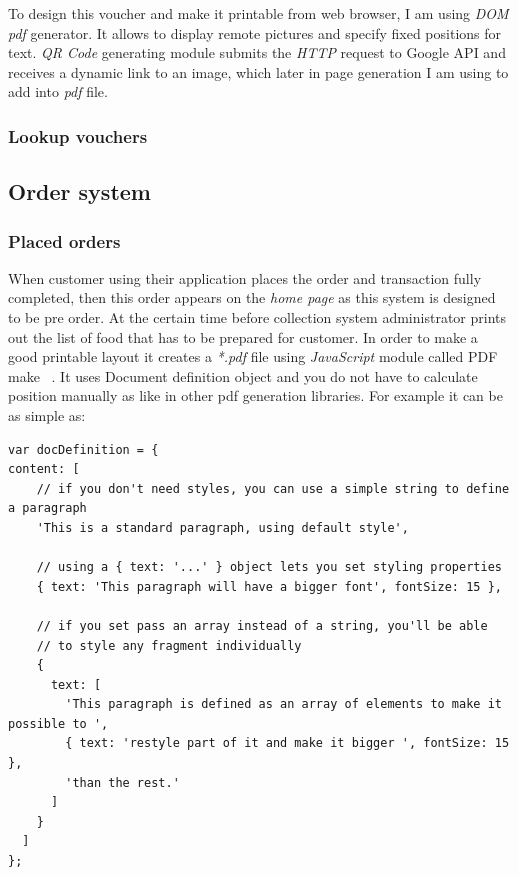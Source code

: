 To design this voucher and make it printable from web browser, I am using \textit{DOM pdf} generator. It allows to display remote pictures and specify fixed positions for text. \textit{QR Code} generating module submits the \textit{HTTP} request to Google API and receives a dynamic link to an image, which later in page generation I am using to add into \textit{pdf} file.


	\subsubsection{Lookup vouchers}
	

	\subsection{Order system}
		\subsubsection{Placed orders}
			When customer using their application places the order and transaction fully completed, then this order appears on the \textit{home page} as this system is designed to be pre order. At the certain time before collection system administrator prints out the list of food that has to be prepared for customer. In order to make a good printable layout it creates a \textit{*.pdf} file using \textit{JavaScript} module called PDF make ~\cite{PDF_Make_module}. It uses Document definition object and you do not have to calculate position manually as like in other pdf generation libraries. For example it can be as simple as:
			\\
			\begin{verbatim}
var docDefinition = {
content: [
    // if you don't need styles, you can use a simple string to define a paragraph
    'This is a standard paragraph, using default style',

    // using a { text: '...' } object lets you set styling properties
    { text: 'This paragraph will have a bigger font', fontSize: 15 },

    // if you set pass an array instead of a string, you'll be able
    // to style any fragment individually
    {
      text: [
        'This paragraph is defined as an array of elements to make it possible to ',
        { text: 'restyle part of it and make it bigger ', fontSize: 15 },
        'than the rest.'
      ]
    }
  ]
};
			\end{verbatim}
			
